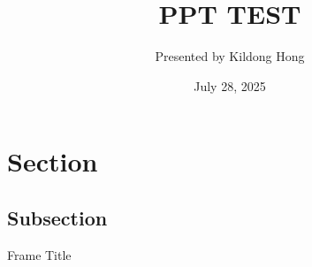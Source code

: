 \documentclass[serif,table,10pt,aspectratio=169]{beamer}
\title[]{\large
PPT TEST
}
\date[August, 2025]{July 28, 2025}
\author[J.~Smith]{Presented by Kildong Hong}
\institute{FCAI Lab \\Yonsei University}
\begin{document}
\frame{\titlepage}

\section{Section}

\subsection{Subsection}

\begin{frame}{Frame Title}
    
\end{frame}
\end{document}
